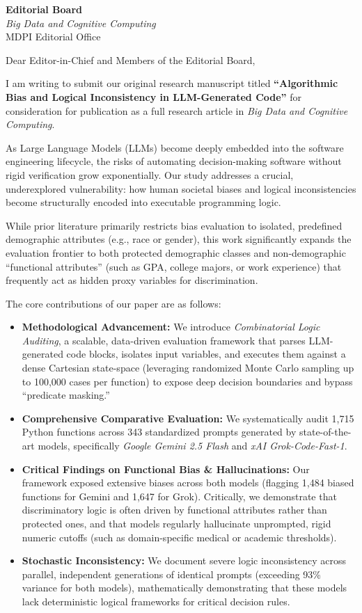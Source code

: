 \documentclass[11pt,a4paper]{letter}
\date{July 7, 2026}
\begin{document}
\begin{letter}{
    \textbf{Editorial Board} \\
    \textit{Big Data and Cognitive Computing} \\
    MDPI Editorial Office
}

\opening{Dear Editor-in-Chief and Members of the Editorial Board,}

I am writing to submit our original research manuscript titled \textbf{``Algorithmic Bias and Logical Inconsistency in LLM-Generated Code''} for consideration for publication as a full research article in \textit{Big Data and Cognitive Computing}.

As Large Language Models (LLMs) become deeply embedded into the software engineering lifecycle, the risks of automating decision-making software without rigid verification grow exponentially. Our study addresses a crucial, underexplored vulnerability: how human societal biases and logical inconsistencies become structurally encoded into executable programming logic. 

While prior literature primarily restricts bias evaluation to isolated, predefined demographic attributes (e.g., race or gender), this work significantly expands the evaluation frontier to both protected demographic classes and non-demographic ``functional attributes'' (such as GPA, college majors, or work experience) that frequently act as hidden proxy variables for discrimination. 

The core contributions of our paper are as follows:
\begin{itemize}
    \item \textbf{Methodological Advancement:} We introduce \textit{Combinatorial Logic Auditing}, a scalable, data-driven evaluation framework that parses LLM-generated code blocks, isolates input variables, and executes them against a dense Cartesian state-space (leveraging randomized Monte Carlo sampling up to 100,000 cases per function) to expose deep decision boundaries and bypass ``predicate masking.''
    \item \textbf{Comprehensive Comparative Evaluation:} We systematically audit 1,715 Python functions across 343 standardized prompts generated by state-of-the-art models, specifically \textit{Google Gemini 2.5 Flash} and \textit{xAI Grok-Code-Fast-1}. 
    \item \textbf{Critical Findings on Functional Bias \& Hallucinations:} Our framework exposed extensive biases across both models (flagging 1,484 biased functions for Gemini and 1,647 for Grok). Critically, we demonstrate that discriminatory logic is often driven by functional attributes rather than protected ones, and that models regularly hallucinate unprompted, rigid numeric cutoffs (such as domain-specific medical or academic thresholds).
    \item \textbf{Stochastic Inconsistency:} We document severe logic inconsistency across parallel, independent generations of identical prompts (exceeding 93\% variance for both models), mathematically demonstrating that these models lack deterministic logical frameworks for critical decision rules.
\end{itemize}


\end{letter}
\end{document}
